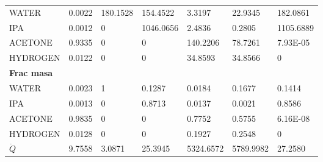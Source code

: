 \begin{table}[H]
\begin{tabular}{lllllll}
    WATER          & 0.0022 & 180.1528 & 154.4522  & 3.3197    & 22.9345   & 182.0861   \\
    IPA            & 0.0012 & 0        & 1046.0656 & 2.4836    & 0.2805    & 1105.6889  \\
    ACETONE        & 0.9335 & 0        & 0         & 140.2206  & 78.7261   & 7.93E-05   \\
    HYDROGEN       & 0.0122 & 0        & 0         & 34.8593   & 34.8566   & 0          \\
    \textbf{Frac masa} &        &          &           &           &           &            \\
    WATER          & 0.0023 & 1        & 0.1287    & 0.0184    & 0.1677    & 0.1414     \\
    IPA            & 0.0013 & 0        & 0.8713    & 0.0137    & 0.0021    & 0.8586     \\
    ACETONE        & 0.9835 & 0        & 0         & 0.7752    & 0.5755    & 6.16E-08   \\
    HYDROGEN       & 0.0128 & 0        & 0         & 0.1927    & 0.2548    & 0          \\
    $\dot{Q}$   & 9.7558 & 3.0871   & 25.3945   & 5324.6572 & 5789.9982 & 27.2580   \\ \hline
    \end{tabular}
\end{table}
